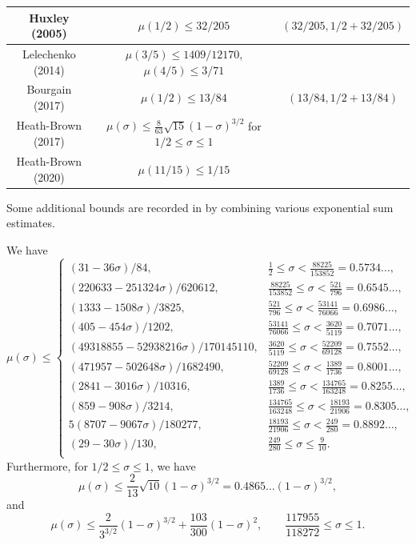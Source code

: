 \begin{table}[ht]
\begin{tabular}{|c|c|c|}
\hline
Huxley (2005) \cite{huxley_exponential_2005} & $\mu(1/2) \leq 32/205$ & $(32/205, 1/2+32/205)$ \\
\hline
Lelechenko (2014) \cite{Lelechenko_linear_2014} & $\mu(3/5) \leq 1409/12170$, $\mu(4/5) \leq 3/71$& \\
\hline
Bourgain (2017) \cite{bourgain_decoupling_2017} & $\mu(1/2) \leq 13/84$ & $(13/84, 1/2+13/84)$ \\
\hline
Heath-Brown (2017) \cite{heathbrown_new_2017} & $\mu(\sigma) \le \frac{8}{63}\sqrt{15}(1 - \sigma)^{3/2}$ for $1/2 \le \sigma \le 1$& \\
\hline
Heath-Brown (2020) \cite{demeter_small_2020} & $\mu(11/15) \leq 1/15$& \\
\hline
\end{tabular}
\end{table}

\literature
{}

Some additional bounds are recorded in \cite{trudgian-yang} by combining various exponential sum estimates. 

\begin{theorem}\label{mu_est_thm}\cite[Theorems 2.4-2.6]{trudgian-yang}
    We have
    \[
    \mu(\sigma) \le \begin{cases}
         (31 - 36\sigma)/84 , & \frac{1}{2} \leq\sigma < \frac{88225}{153852} = 0.5734\ldots, \\
         (220633 - 251324\sigma)/620612 , & \frac{88225}{153852} \leq\sigma < \frac{521}{796} = 0.6545\ldots, \\
         (1333 - 1508\sigma)/3825 , & \frac{521}{796} \leq\sigma < \frac{53141}{76066} = 0.6986\ldots, \\
         (405 - 454\sigma)/1202 , & \frac{53141}{76066} \leq\sigma < \frac{3620}{5119} = 0.7071\ldots, \\
         (49318855 - 52938216\sigma)/170145110 , & \frac{3620}{5119} \leq\sigma < \frac{52209}{69128} = 0.7552\ldots, \\
         (471957 - 502648\sigma)/1682490 , & \frac{52209}{69128} \leq\sigma < \frac{1389}{1736} = 0.8001\ldots, \\
         (2841 - 3016\sigma)/10316 , & \frac{1389}{1736} \leq\sigma < \frac{134765}{163248} = 0.8255\ldots, \\
         (859 - 908\sigma)/3214 , & \frac{134765}{163248} \leq\sigma < \frac{18193}{21906} = 0.8305\ldots, \\
         5(8707 - 9067\sigma)/180277 , & \frac{18193}{21906} \leq\sigma < \frac{249}{280} = 0.8892\ldots, \\
         (29 - 30\sigma)/130 , & \frac{249}{280} \leq\sigma \leq \frac{9}{10}.\\
    \end{cases}
    \]
    Furthermore, for $1/2 \le \sigma \le 1$, we have
\[
\mu(\sigma) \le \frac{2}{13}\sqrt{10}(1 - \sigma)^{3/2} = 0.4865\ldots(1 - \sigma)^{3/2},
\]
and
\[
\mu(\sigma) \le \frac{2}{3^{3/2}}(1 - \sigma)^{3/2} + \frac{103}{300}(1 - \sigma)^{2},\qquad \frac{117955}{118272} \le \sigma \le 1.
\]
\end{theorem}

